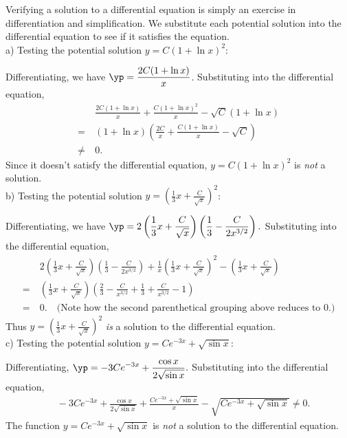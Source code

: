 {Verifying a solution to a differential equation is simply an exercise in differentiation and simplification.  We substitute each potential solution into the differential equation to see if it satisfies the equation.\\

\noindent a) Testing the potential solution $y = C \left ( 1 + \ln x \right )^2$:

Differentiating, we have $\displaystyle \yp = \frac{2C(1 + \ln x)}{x}$.  Substituting into the differential equation,
\begin{align*}
&\ \frac{2C(1+\ln x)}{x} + \frac{C(1+\ln x)^2}{x} -\sqrt{C}(1+\ln x)\\
=&\ (1+\ln x)\left( \frac{2C}{x} + \frac{C(1+\ln x)}{x} - \sqrt{C}\right)\\
 \neq &\ 0.
\end{align*}
Since it doesn't satisfy the differential equation, $y = C(1 + \ln x)^2$ is \emph{not} a solution.\\

\noindent b) Testing the potential solution $\displaystyle y = \left ( \frac{1}{3}x + \frac{C}{\sqrt{x}} \right )^2$:

Differentiating, we have $\displaystyle \yp = 2\left ( \frac{1}{3}x + \frac{C}{\sqrt{x}} \right )\left ( \frac{1}{3} - \frac{C}{2x^{3/2}}\right ).$ Substituting into the differential equation,
\begin{align*}
&\ 2\left ( \frac{1}{3}x + \frac{C}{\sqrt{x}} \right )\left ( \frac{1}{3} - \frac{C}{2x^{3/2}}\right ) + \frac{1}{x}\left ( \frac{1}{3}x + \frac{C}{\sqrt{x}} \right )^2 - \left (\frac{1}{3}x + \frac{C}{\sqrt{x}}\right) \\
=&\ \left ( \frac{1}{3}x + \frac{C}{\sqrt{x}} \right ) \left ( \frac{2}{3} - \frac{C}{x^{3/2}} + \frac{1}{3} + \frac{C}{x^{3/2}} - 1 \right )\\
=&\ 0.\quad \text{(Note how the second parenthetical grouping above reduces to 0.)}
\end{align*}
Thus  $\displaystyle y = \left ( \frac{1}{3}x + \frac{C}{\sqrt{x}} \right )^2$ \emph{is} a solution to the differential equation.\\

\noindent c) Testing the potential solution $\displaystyle y = C e^{-3x} + \sqrt{\sin x}$:

Differentiating, $\displaystyle \yp = -3Ce^{-3x} + \frac{\cos x}{2\sqrt{\sin x}}.$ Substituting into the differential equation,
\begin{align*}
&\ -3Ce^{-3x} + \frac{\cos x}{2\sqrt{\sin x}} + \frac{C e^{-3x} + \sqrt{\sin x}}{x} - \sqrt{C e^{-3x} + \sqrt{\sin x}} \neq 0.
\end{align*}
The function $\displaystyle y = C e^{-3x} + \sqrt{\sin x}$ is \emph{not} a solution to the differential equation.
}\\

